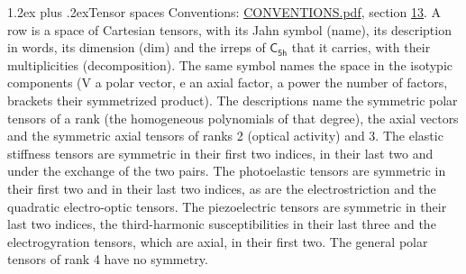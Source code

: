 \documentclass[10pt,a4paper]{article}
\makeatletter
\renewcommand\section{\@startsection{section}{1}{\z@}{-3ex plus -1ex minus -.2ex}%
  {1.2ex plus .2ex}{\normalfont\large\sffamily\bfseries\color{parttitle}}}
\numberwithin{equation}{section}
\newcommand{\grp}[1]{\mathsf{#1}}
\makeatother
\begin{document}
\section{Tensor spaces}\label{s:tensor_spaces}
Conventions: \href{../../CONVENTIONS.pdf}{CONVENTIONS.pdf}, section \href{../../CONVENTIONS.pdf\#conv.13}{13}.
\leavevmode\label{n:head.name}\label{n:head.description}\label{n:head.dim}\label{n:head.decomposition}A row is a space of Cartesian tensors, with its Jahn symbol (name), its description in words, its dimension (dim) and the irreps of $\grp{C_{5h}}$ that it carries, with their multiplicities (decomposition). \label{n:label.jahn}The same symbol names the space in the isotypic components (V a polar vector, e an axial factor, a power the number of factors, brackets their symmetrized product). The descriptions name the symmetric polar tensors of a rank (the homogeneous polynomials of that degree), the axial vectors and the symmetric axial tensors of ranks 2 (optical activity) and 3. The elastic stiffness tensors are symmetric in their first two indices, in their last two and under the exchange of the two pairs. The photoelastic tensors are symmetric in their first two and in their last two indices, as are the electrostriction and the quadratic electro-optic tensors. The piezoelectric tensors are symmetric in their last two indices, the third-harmonic susceptibilities in their last three and the electrogyration tensors, which are axial, in their first two. The general polar tensors of rank 4 have no symmetry.
\end{document}
